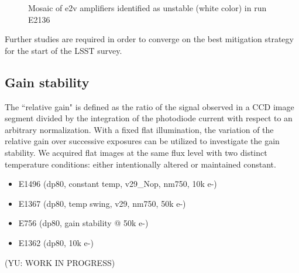 \begin{figure}[htbp]
\begin{minipage}{0.45\textwidth}
    \caption{Mosaic of e2v amplifiers identified as unstable (white color) in run E2136}
    \label{fig:stability_mosaic}
\end{minipage}
\end{figure}

%

Further studies are required in order to converge on the best mitigation
strategy for the start of the LSST survey.

\subsection{Gain stability}\label{sec:gain-stability-2}
The ``relative gain" is defined as the ratio of the signal observed in a CCD image segment divided by the integration of the photodiode current with respect to an arbitrary normalization.
With a fixed flat illumination, the variation of the relative gain over successive exposures can be utilized to investigate the gain stability. We acquired flat images at the same flux level with two distinct temperature conditions: either intentionally altered or maintained constant.
\begin{itemize}
    \item E1496 (dp80, constant temp, v29\_Nop, nm750, 10k e-)
    \item E1367 (dp80, temp swing, v29, nm750, 50k e-)
    \item E756 (dp80, gain stability @ 50k e-)
    \item E1362 (dp80, 10k e-)
\end{itemize}
(YU: WORK IN PROGRESS)


